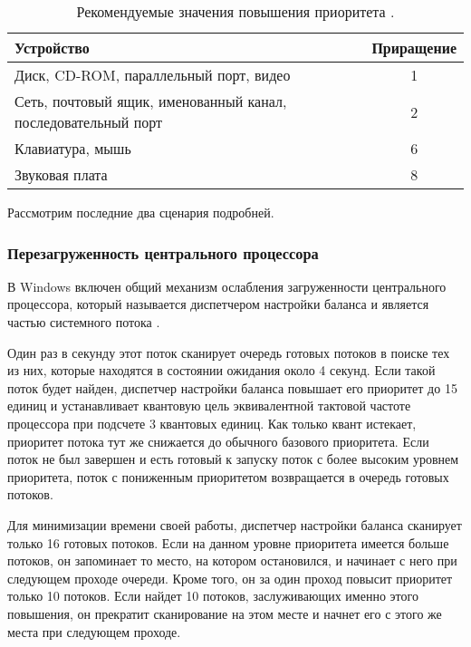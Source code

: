 \begin{table}[h]
\captionsetup{justification=raggedright,singlelinecheck=off}
	\caption{Рекомендуемые значения повышения приоритета \cite{win7}.}
	\begin{center}
		\begin{tabular}{p{100mm}c}
			\hline
			\textbf{Устройство} & \textbf{Приращение} \\
			\hline
			Диск, CD-ROM, параллельный порт, видео & 1 \\
			Сеть, почтовый ящик, именованный канал, последовательный порт & 2 \\
			Клавиатура, мышь & 6 \\
			Звуковая плата & 8 \\
			\hline
		\end{tabular}
	\end{center}
	\label{tab:io}
\end{table}

Рассмотрим последние два сценария подробней. 

\subsubsection*{Перезагруженность центрального процессора}

В Windows включен общий механизм ослабления загруженности центрального процессора, который называется диспетчером настройки баланса и является частью системного потока \cite{win8}.

Один раз в секунду этот поток сканирует очередь готовых потоков в поиске тех из них, которые находятся в состоянии ожидания около 4 секунд. Если такой поток будет найден, диспетчер настройки баланса повышает его приоритет до 15 единиц и устанавливает квантовую цель эквивалентной тактовой частоте процессора при подсчете 3 квантовых единиц. Как только квант истекает, приоритет потока тут же снижается до обычного базового приоритета. Если поток не был завершен и есть готовый к запуску поток с более высоким уровнем приоритета, поток с пониженным приоритетом возвращается в очередь готовых потоков.

Для минимизации времени своей работы, диспетчер настройки баланса сканирует только 16 готовых потоков. Если на данном уровне приоритета имеется больше потоков, он запоминает то место, на котором остановился, и начинает с него при следующем проходе очереди. Кроме того, он за один проход повысит приоритет только 10 потоков. Если найдет 10 потоков, заслуживающих именно этого повышения, он прекратит сканирование на этом месте и начнет его с этого же места при следующем проходе.

